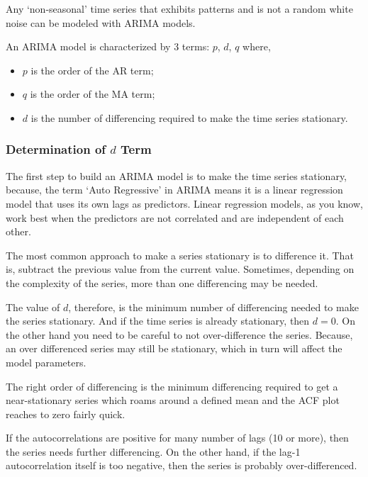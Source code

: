 \documentclass[11pt]{article}
\providecommand{\tightlist}{%
      \setlength{\itemsep}{0pt}\setlength{\parskip}{0pt}}
\begin{document}
Any `non-seasonal' time series that exhibits patterns and is not a
random white noise can be modeled with ARIMA models.

An ARIMA model is characterized by 3 terms: \(p\), \(d\), \(q\) where,

\begin{itemize}
\tightlist
\item
  \(p\) is the order of the AR term;
\item
  \(q\) is the order of the MA term;
\item
  \(d\) is the number of differencing required to make the time series
  stationary.
\end{itemize}

\hypertarget{determination-of-d-term}{%
\subsubsection{\texorpdfstring{Determination of \(d\)
Term}{Determination of d Term}}\label{determination-of-d-term}}

The first step to build an ARIMA model is to make the time series
stationary, because, the term `Auto Regressive' in ARIMA means it is a
linear regression model that uses its own lags as predictors. Linear
regression models, as you know, work best when the predictors are not
correlated and are independent of each other.

The most common approach to make a series stationary is to difference
it. That is, subtract the previous value from the current value.
Sometimes, depending on the complexity of the series, more than one
differencing may be needed.

The value of \(d\), therefore, is the minimum number of differencing
needed to make the series stationary. And if the time series is already
stationary, then \(d = 0\). On the other hand you need to be careful to
not over-difference the series. Because, an over differenced series may
still be stationary, which in turn will affect the model parameters.

The right order of differencing is the minimum differencing required to
get a near-stationary series which roams around a defined mean and the
ACF plot reaches to zero fairly quick.

If the autocorrelations are positive for many number of lags (10 or
more), then the series needs further differencing. On the other hand, if
the lag-1 autocorrelation itself is too negative, then the series is
probably over-differenced.
\end{document}
